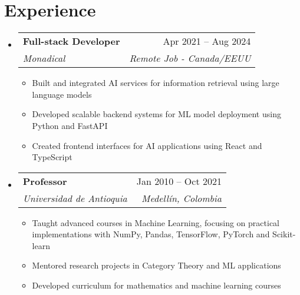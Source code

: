 \documentclass[letterpaper,11pt]{article}
\makeatletter
\newcommand{\resumeSubheading}[4]{
  \vspace{-2pt}
  \item[]
  \begin{tabular*}{\textwidth}{@{\extracolsep{\fill}}l r}
    \textbf{#1} & #2 \\
    \textit{#3} & \textit{#4} \\
  \end{tabular*}
  \vspace{-5pt}
}
\makeatother
\begin{document}
\section{Experience}
\begin{itemize}[leftmargin=0pt, itemindent=0pt, label={}]
\resumeSubheading
{Full-stack Developer}{Apr 2021 -- Aug 2024}
{Monadical}{Remote Job - Canada/EEUU}
\begin{itemize}[leftmargin=*]
    \item Built and integrated AI services for information retrieval using large language models
    \item Developed scalable backend systems for ML model deployment using Python and FastAPI
    \item Created frontend interfaces for AI applications using React and TypeScript
\end{itemize}

\resumeSubheading
{Professor}{Jan 2010 -- Oct 2021}
{Universidad de Antioquia}{Medellín, Colombia}
\begin{itemize}[leftmargin=*]
    \item Taught advanced courses in Machine Learning, focusing on practical implementations with NumPy, Pandas, TensorFlow, PyTorch and Scikit-learn
    \item Mentored research projects in Category Theory and ML applications
    \item Developed curriculum for mathematics and machine learning courses
\end{itemize}
\end{itemize}
\end{document}
